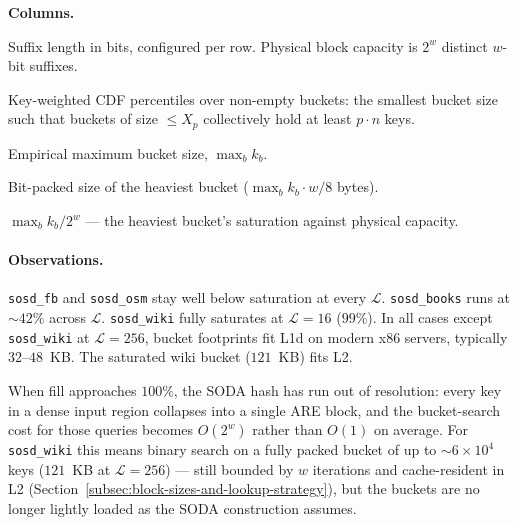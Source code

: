 \begin{table}[H]
    \medskip
    \noindent\textbf{Columns.}
    \begin{description}[leftmargin=2.2cm, labelwidth=2cm, labelsep=0.2cm,
        style=nextline, itemsep=2pt, topsep=4pt]
\item[$w$] Suffix length in bits, configured per row. Physical block
capacity is $2^w$ distinct $w$-bit suffixes.
\item[$X_{50}$, $X_{90}$] Key-weighted CDF percentiles over non-empty
buckets: the smallest bucket size such that buckets of size $\leq X_p$
collectively hold at least $p \cdot n$ keys.
\item[\emph{Max}] Empirical maximum bucket size, $\max_b k_b$.
\item[\emph{Max footprint}] Bit-packed size of the heaviest bucket
($\max_b k_b \cdot w / 8$ bytes).
\item[\emph{Fill}] $\max_b k_b / 2^w$ --- the heaviest bucket's
saturation against physical capacity.
    \end{description}
\end{table}

\paragraph{Observations.}
\texttt{sosd\_fb} and \texttt{sosd\_osm} stay well below saturation at
every $\mathcal{L}$. \texttt{sosd\_books} runs at ${\sim}42\%$ across
$\mathcal{L}$. \texttt{sosd\_wiki} fully saturates at $\mathcal{L} = 16$
($99\%$).
In all cases except \texttt{sosd\_wiki} at $\mathcal{L}=256$, bucket footprints fit L1d on modern x86 servers, typically $32$--$48$~KB.
The saturated wiki bucket ($121$~KB) fits L2.

When fill approaches $100\%$, the SODA hash has run out of resolution:
every key in a dense input region collapses into a single ARE block, and
the bucket-search cost for those queries becomes $O(2^w)$ rather than
$O(1)$ on average. For \texttt{sosd\_wiki} this means binary search on a
fully packed bucket of up to ${\sim}6 \times 10^4$ keys ($121$~KB at
$\mathcal{L} = 256$) --- still bounded by $w$ iterations and cache-resident
in L2 (Section~\ref{subsec:block-sizes-and-lookup-strategy}),
but the buckets are no longer lightly loaded as the SODA construction assumes.